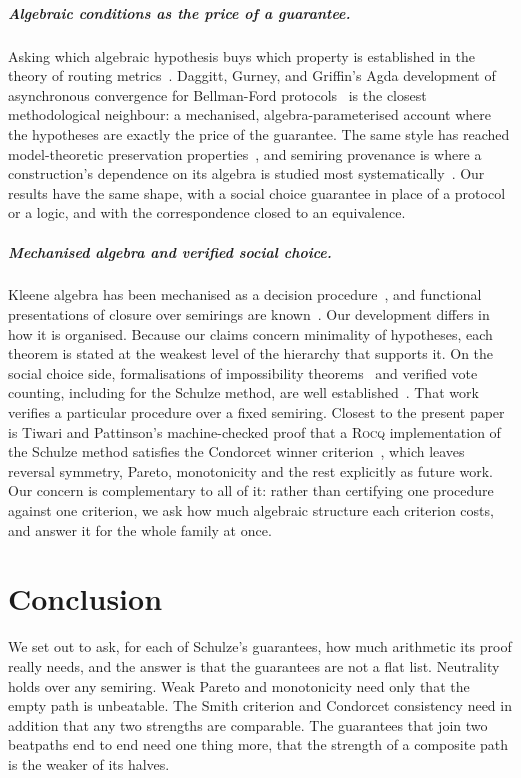 \documentclass[a4paper,UKenglish,cleveref,autoref,thm-restate,anonymous]{lipics-v2021}
\newcommand{\rocq}{\textsc{Rocq}}
\begin{document}
\subparagraph*{Algebraic conditions as the price of a guarantee.}
Asking which algebraic hypothesis buys which property is established in the
theory of routing metrics~\cite{10.1145/3387514.3405864}. Daggitt, Gurney,
and Griffin's Agda development of asynchronous convergence for Bellman-Ford
protocols~\cite{10.1145/3230543.3230561} is the closest methodological
neighbour: a mechanised, algebra-parameterised account where the hypotheses
are exactly the price of the guarantee. The same style has reached
model-theoretic preservation properties~\cite{brinke2026}, and semiring
provenance is where a construction's dependence on its algebra is studied
most systematically~\cite{10.1145/1265530.1265535,10.5555/3319379.3319390}.
Our results have the same shape, with a social choice guarantee in place of
a protocol or a logic, and with the correspondence closed to an
equivalence.

\subparagraph*{Mechanised algebra and verified social choice.}
Kleene algebra has been mechanised as a decision
procedure~\cite{10.1007/978-3-642-14052-5_13,MOREIRA2015377}, and functional
presentations of closure over semirings are
known~\cite{10.1007/978-3-319-17822-6_14}. Our development differs in how it
is organised. Because our claims concern minimality of hypotheses, each
theorem is stated at the weakest level of the hierarchy that supports it. On the
social choice side, formalisations of impossibility
theorems~\cite{arrow1950difficulty,nipkow2009social} and verified vote counting, including for
the Schulze method, are well
established~\cite{10.1007/978-3-319-66107-0_26,ghale2018modular,10.1007/978-3-030-03592-1_5}.
That work verifies a particular procedure over a fixed semiring. Closest to the
present paper is Tiwari and Pattinson's machine-checked proof that a
\rocq{} implementation of the Schulze method satisfies the Condorcet winner
criterion~\cite{tiwari2021machine}, which leaves reversal symmetry, Pareto,
monotonicity and the rest explicitly as future work. Our concern is
complementary to all of it: rather than certifying one procedure against one
criterion, we ask how much algebraic structure each criterion costs, and
answer it for the whole family at once. 

\section{Conclusion}\label{sec:conclusion}

We set out to ask, for each of Schulze's guarantees, how much arithmetic
its proof really needs, and the answer is that the guarantees are not a
flat list. Neutrality holds over any semiring. Weak Pareto and
monotonicity need only that the empty path is unbeatable. The Smith
criterion and Condorcet consistency need in addition that any two
strengths are comparable. The guarantees that join two beatpaths end to
end need one thing more, that the strength of a composite path is the
weaker of its halves.
\end{document}
